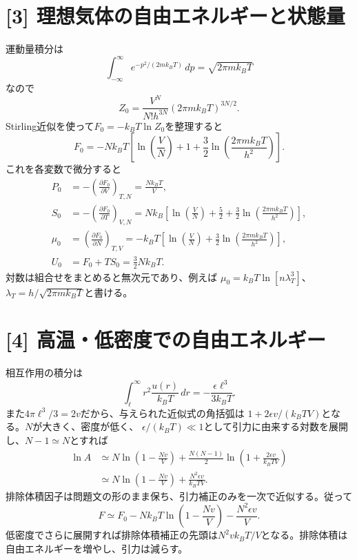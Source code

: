\documentclass[11pt,a4paper]{article}
\begin{document}
\section*{[3] 理想気体の自由エネルギーと状態量}
運動量積分は
\begin{equation}
 \int_{-\infty}^{\infty}e^{-p^2/(2mk_BT)}\,dp=\sqrt{2\pi mk_BT}
\end{equation}
なので
\begin{equation}
 Z_0=\frac{V^N}{N!h^{3N}}(2\pi mk_BT)^{3N/2}.
\end{equation}
Stirling近似を使って$F_0=-k_BT\ln Z_0$を整理すると
\begin{equation}
 F_0=-Nk_BT\left[\ln\!\left(\frac{V}{N}\right)+1
 +\frac32\ln\!\left(\frac{2\pi mk_BT}{h^2}\right)\right].
\end{equation}
これを各変数で微分すると
\begin{align}
 P_0&=-\left(\frac{\partial F_0}{\partial V}\right)_{T,N}
 =\boxed{\frac{Nk_BT}{V}},\\
 S_0&=-\left(\frac{\partial F_0}{\partial T}\right)_{V,N}
 =\boxed{Nk_B\left[\ln\!\left(\frac{V}{N}\right)+\frac52
 +\frac32\ln\!\left(\frac{2\pi mk_BT}{h^2}\right)\right]},\\
 \mu_0&=\left(\frac{\partial F_0}{\partial N}\right)_{T,V}
 =\boxed{-k_BT\left[\ln\!\left(\frac{V}{N}\right)
 +\frac32\ln\!\left(\frac{2\pi mk_BT}{h^2}\right)\right]},\\
 U_0&=F_0+TS_0=\boxed{\frac32Nk_BT}.
\end{align}
対数は組合せをまとめると無次元であり、例えば
$\mu_0=k_BT\ln[n\lambda_T^3]$、$\lambda_T=h/\sqrt{2\pi mk_BT}$と書ける。

\section*{[4] 高温・低密度での自由エネルギー}
相互作用の積分は
\begin{equation}
 \int_\ell^\infty r^2\frac{u(r)}{k_BT}\,dr
 =-\frac{\epsilon\ell^3}{3k_BT}.
\end{equation}
また$4\pi\ell^3/3=2v$だから、与えられた近似式の角括弧は
$1+2\epsilon v/(k_BTV)$となる。$N$が大きく、密度が低く、
 $\epsilon/(k_BT)\ll1$として引力に由来する対数を展開し、$N-1\simeq N$とすれば
\begin{align}
 \ln A&\simeq N\ln\left(1-\frac{Nv}{V}\right)
 +\frac{N(N-1)}2\ln\left(1+\frac{2\epsilon v}{k_BTV}\right)\\
 &\simeq N\ln\left(1-\frac{Nv}{V}\right)
 +\frac{N^2\epsilon v}{k_BTV}.
\end{align}
排除体積因子は問題文の形のまま保ち、引力補正のみを一次で近似する。従って
\begin{equation}
 \boxed{F\simeq F_0-Nk_BT\ln\left(1-\frac{Nv}{V}\right)
 -\frac{N^2\epsilon v}{V}}.
\end{equation}
低密度でさらに展開すれば排除体積補正の先頭は$N^2vk_BT/V$となる。排除体積は自由エネルギーを増やし、引力は減らす。
\end{document}

